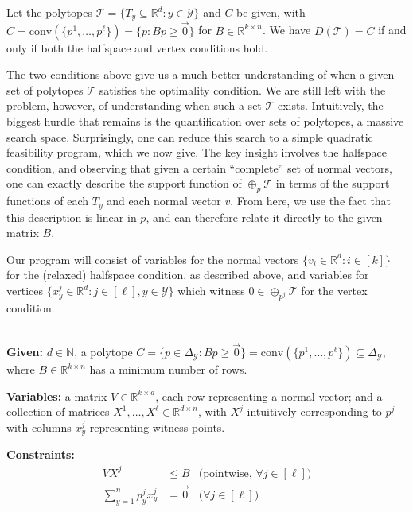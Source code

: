 \documentclass[anon]{colt2020} %
\newcommand{\reals}{\mathbb{R}}
\newcommand{\simplex}{\Delta_\Y}
\newcommand{\T}{\mathcal{T}}
\newcommand{\Y}{\mathcal{Y}}
\newcommand{\conv}{\mathrm{conv}}
\begin{document}
\begin{theorem} \label{thm:vertex-halfspace-opt}
  Let the polytopes $\T = \{T_y \subseteq \reals^d : y \in \Y\}$ and $C$ be given, with $C = \conv(\{p^1,\ldots,p^{\ell}\}) = \{p: Bp \geq \vec 0\}$ for $B \in \reals^{k \times n}$.
  We have $D(\T) = C$ if and only if both the halfspace and vertex conditions hold.
\end{theorem}

The two conditions above give us a much better understanding of when a given set of polytopes $\T$ satisfies the optimality condition.
We are still left with the problem, however, of understanding when such a set $\T$ exists.
Intuitively, the biggest hurdle that remains is the quantification over sets of polytopes, a massive search space.
Surprisingly, one can reduce this search to a simple quadratic feasibility program, which we now give.
The key insight involves the halfspace condition, and observing that given a certain ``complete'' set of normal vectors, one can exactly describe the support function of $\oplus_p\T$ in terms of the support functions of each $T_y$ and each normal vector $v$.
From here, we use the fact that this description is linear in $p$, and can therefore relate it directly to the given matrix $B$.

Our program will consist of variables for the normal vectors $\{v_i \in \reals^d : i \in [k]\}$ for the (relaxed) halfspace condition, as described above, and variables for vertices $\{x^j_y \in \reals^d : j \in [\ell], y \in \Y\}$ which witness $0\in\oplus_{p^j} \T$ for the vertex condition.

\begin{definition} \label{def:qfp} ~ \\
  \indent 
  \textbf{Given:} $d \in \mathbb{N}$, a polytope $C = \{p \in \simplex : Bp \geq \vec 0\} = \conv(\{p^1, \ldots, p^\ell\}) \subseteq \simplex$, where $B \in \reals^{k \times n}$ has a minimum number of rows.

  \textbf{Variables:} a matrix $V \in \reals^{k \times d}$, each row representing a normal vector; and a collection of matrices $X^1,\ldots,X^{\ell} \in \reals^{d \times n}$, with $X^j$ intuitively corresponding to $p^j$ with columns $x^j_y$ representing witness points.

  \textbf{Constraints:}
    \begin{align}
      V X^j                     &\leq B    & \text{(pointwise, $\forall j \in [\ell]$)}  \label{eqn:qp-constr-1} \\
      \sum_{y=1}^n p^j_y x^j_y &= \vec 0  & \text{($\forall j \in [\ell]$)}    \label{eqn:qp-constr-2}
    \end{align}
\end{definition}
\end{document}
